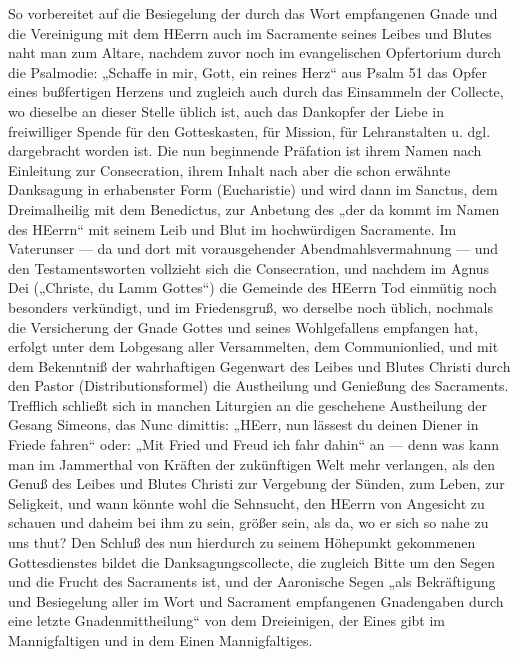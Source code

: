 So vorbereitet auf die Besiegelung der durch das Wort empfangenen Gnade und die Vereinigung mit dem HEerrn auch im Sacramente seines Leibes und Blutes naht man zum Altare, nachdem zuvor noch im evangelischen Opfertorium durch die Psalmodie: „Schaffe in mir, Gott, ein reines Herz“ aus Psalm 51 das Opfer eines bußfertigen Herzens und zugleich auch durch das Einsammeln der Collecte, wo dieselbe an dieser Stelle üblich ist, auch das Dankopfer der Liebe in freiwilliger Spende für den Gotteskasten, für Mission, für Lehranstalten u. dgl. dargebracht worden ist. Die nun beginnende Präfation ist ihrem Namen nach Einleitung zur Consecration, ihrem Inhalt nach aber die schon erwähnte Danksagung in erhabenster Form (Eucharistie) und wird dann im Sanctus, dem Dreimalheilig mit dem Benedictus, zur Anbetung des „der da kommt im Namen des HEerrn“ mit seinem Leib und Blut im hochwürdigen Sacramente. Im Vaterunser — da und dort mit vorausgehender Abendmahlsvermahnung — und den Testamentsworten vollzieht sich die Consecration, und nachdem im Agnus Dei („Christe, du Lamm Gottes“) die Gemeinde des HEerrn Tod einmütig noch besonders verkündigt, und im Friedensgruß, wo derselbe noch üblich, nochmals die Versicherung der Gnade Gottes und seines Wohlgefallens empfangen hat, erfolgt unter dem Lobgesang aller Versammelten, dem Communionlied, und mit dem Bekenntniß der wahrhaftigen Gegenwart des Leibes und Blutes Christi durch den Pastor (Distributionsformel) die Austheilung und Genießung des Sacraments. Trefflich schließt sich in manchen Liturgien an die geschehene Austheilung der Gesang Simeons, das Nunc dimittis: „HEerr, nun lässest du deinen Diener in Friede fahren“ oder: „Mit Fried und Freud ich fahr dahin“ an — denn was kann man im Jammerthal von Kräften der zukünftigen Welt mehr verlangen, als den Genuß des Leibes und Blutes Christi zur Vergebung der Sünden, zum Leben, zur Seligkeit, und wann könnte wohl die Sehnsucht, den HEerrn von Angesicht zu schauen und daheim bei ihm zu sein, größer sein, als da, wo er sich so nahe zu uns thut? Den Schluß des
nun hierdurch zu seinem Höhepunkt gekommenen Gottesdienstes bildet die Danksagungscollecte, die zugleich Bitte um den Segen und die Frucht des Sacraments ist, und der Aaronische Segen „als Bekräftigung und Besiegelung aller im Wort und Sacrament empfangenen Gnadengaben durch eine letzte Gnadenmittheilung“ von dem Dreieinigen, der Eines gibt im Mannigfaltigen und in dem Einen Mannigfaltiges.

